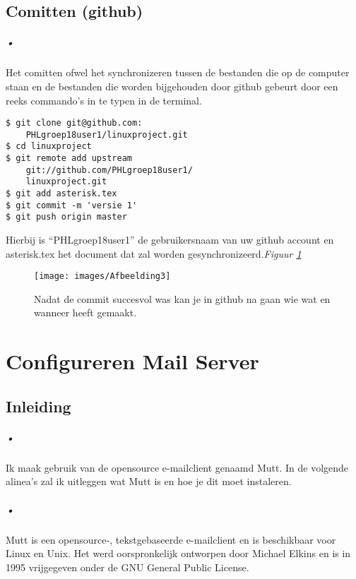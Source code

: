 \documentclass[12pt,a4paper]{report}
\begin{document}
\section{Comitten (github)}
\paragraph{•}
Het comitten ofwel het synchronizeren tussen de bestanden die op de computer staan en de bestanden die worden bijgehouden door github gebeurt door een reeks commando's in te typen in de terminal.
\begin{lstlisting}[frame=BTrl]
$ git clone git@github.com:
	PHLgroep18user1/linuxproject.git
$ cd linuxproject
$ git remote add upstream 
	git://github.com/PHLgroep18user1/
	linuxproject.git
$ git add asterisk.tex
$ git commit -m 'versie 1'
$ git push origin master
\end{lstlisting}
Hierbij is ``PHLgroep18user1'' de gebruikersnaam van uw github account en asterisk.tex het document dat zal worden gesynchronizeerd.\emph{Figuur \ref{afbeelding3}}
\begin{figure} [h]
\texttt{[image: images/Afbeelding3]}
\caption[Historie github]{Nadat de commit succesvol was kan je in github na gaan wie wat en wanneer heeft gemaakt.}
\label{afbeelding3}
\end{figure}

\renewcommand\thechapter{B} %
\chapter{Configureren Mail Server}
\section{Inleiding}
\paragraph{•}
Ik maak gebruik van de opensource e-mailclient genaamd Mutt. In de volgende alinea's zal ik uitleggen wat Mutt is en hoe je dit moet instaleren.
\paragraph{•}
Mutt is een opensource-, tekstgebaseerde e-mailclient en is beschikbaar voor Linux en Unix. Het werd oorspronkelijk ontworpen door Michael Elkins en is in 1995 vrijgegeven onder de GNU General Public License.
\end{document}
